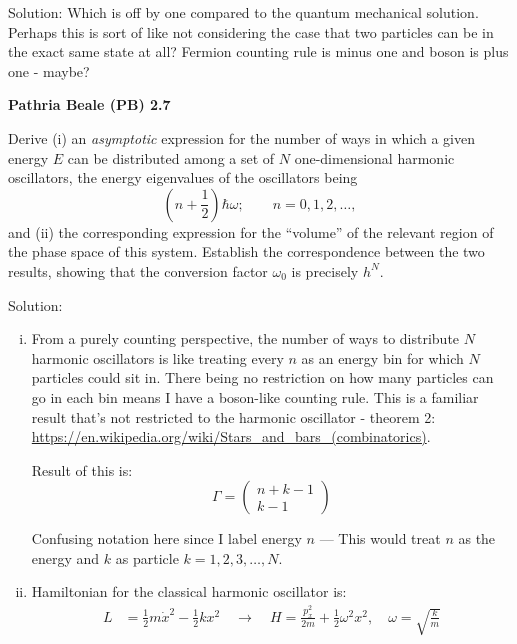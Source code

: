 \begin{homeworkProblem}
\begin{callout}{Solution:}
        Which is off by one compared to the quantum mechanical solution. Perhaps this is sort of like not considering the case that two particles can be in the exact same state at all? Fermion counting rule is minus one and boson is plus one - maybe?

    \end{callout}

\end{homeworkProblem}

\begin{homeworkProblem}
    \textbf{Pathria Beale (PB) 2.7}

    Derive (i) an \emph{asymptotic} expression for the number of ways in which a given
    energy $E$ can be distributed among a set of $N$ one-dimensional harmonic
    oscillators, the energy eigenvalues of the oscillators being
    \[
        \left(n+\frac{1}{2}\right)\hbar\omega;
        \qquad n=0,1,2,\ldots,
    \]
    and (ii) the corresponding expression for the ``volume'' of the relevant region of
    the phase space of this system. Establish the correspondence between the two
    results, showing that the conversion factor $\omega_0$ is precisely $h^N$.
    \begin{callout}{Solution:}

    \begin{enumerate}[(i)]
    \item From a purely counting perspective, the number of ways to distribute $N$ harmonic oscillators is like treating every $n$ as an energy bin for which $N$ particles could sit in. There being no restriction on how many particles can go in each bin means I have a boson-like counting rule. This is a familiar result that's not restricted to the harmonic oscillator - theorem 2: \url{https://en.wikipedia.org/wiki/Stars_and_bars_(combinatorics)}.

        Result of this is:
        $$\Gamma = \begin{pmatrix} n+k-1 \\ k-1 \end{pmatrix}$$

        Confusing notation here since I label energy $n$ --- This would treat $n$ as the energy and $k$ as particle $k= 1, 2, 3, \dots, N$.


        \item Hamiltonian for the classical harmonic oscillator is:
            \begin{align*}
                L &= \frac{1}{2} m\dot{x}^{2} - \frac{1}{2}kx^{2} \quad\to\quad H=\frac{p_x^{2}}{2m} + \frac{1}{2}\omega^{2} x^{2}, \quad \omega=\sqrt{\frac{k}{m}}
            \end{align*}


\end{enumerate}
\end{callout}
\end{homeworkProblem}
